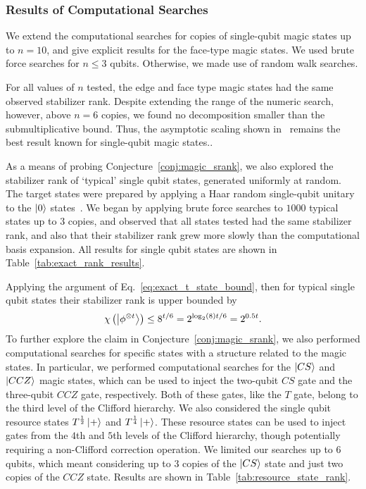 \subsubsection{Results of Computational Searches}
We extend the computational searches for copies of single-qubit magic states up to $n=10$, and give explicit results for the face-type magic states. We used brute force searches for $n\leq 3$ qubits. Otherwise, we made use of random walk searches. 
\par
For all values of $n$ tested, the edge and face type magic states had the same observed stabilizer rank. Despite extending the range of the numeric search, however, above $n=6$ copies, we found no decomposition smaller than the submultiplicative bound. Thus, the asymptotic scaling shown in~\cite{Bravyi2015} remains the best result known for single-qubit magic states..\par
As a means of probing Conjecture~\ref{conj:magic_srank}, we also explored the stabilizer rank of `typical' single qubit states, generated uniformly at random. The target states were prepared by applying a Haar random single-qubit unitary to the $\ket{0}$ states~\cite{Lundberg2004}. We began by applying brute force searches to $1000$ typical states up to $3$ copies, and observed that all states tested had the same stabilizer rank, and also that their stabilizer rank grew more slowly than the computational basis expansion. All results for single qubit states are shown in Table~\ref{tab:exact_rank_results}.\par
Applying the argument of Eq.~\ref{eq:exact_t_state_bound}, then for typical single qubit states their stabilizer rank is upper bounded by
\begin{equation}
\chi\left(\ket{\phi^{\otimes t}}\right)\leq 8^{t/6}=2^{\log_{2}(8)t/6}=2^{0.5t}.
\label{eq:typical_state_srank}
\end{equation}
To further explore the claim in Conjecture~\ref{conj:magic_srank}, we also performed computational searches for specific states with a structure related to the magic states. In particular, we performed computational searches for the $\ket{CS}$ and $\ket{CCZ}$ magic states, which can be used to inject the two-qubit $CS$ gate and the three-qubit $CCZ$ gate, respectively. Both of these gates, like the $T$ gate, belong to the third level of the Clifford hierarchy. We also considered the single qubit resource states $T^{\frac{1}{2}}\ket{+}$ and $T^{\frac{1}{4}}\ket{+}$. These resource states can be used to inject gates from the $4$th and $5$th levels of the Clifford hierarchy, though potentially requiring a non-Clifford correction operation. We limited our searches up to $6$ qubits, which meant considering up to $3$ copies of the $\ket{CS}$ state and just two copies of the $CCZ$ state. Results are shown in Table~\ref{tab:resource_state_rank}.\par
